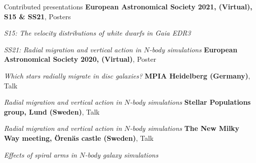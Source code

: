 \begin{rubric}{Contributed presentations}
%
\textbf{European Astronomical Society 2021, (Virtual), S15 \& SS21}, Posters\par
\textit{S15: The velocity distributions of white dwarfs in Gaia EDR3}\par 
\textit{SS21: Radial migration and vertical action in $N$-body simulations}
%
%
\textbf{European Astronomical Society 2020, (Virtual)}, Poster\par
\textit{Which stars radially migrate in disc galaxies?}
%
\entry*[6 May 2020]%
\textbf{MPIA Heidelberg (Germany)}, Talk \par
\textit{Radial migration and vertical action in $N$-body simulations}
%
\entry*[5 May 2020]%
\textbf{Stellar Populations group, Lund (Sweden)}, Talk \par
\textit{Radial migration and vertical action in $N$-body simulations}
%
\entry*[27 May 2019]%
\textbf{The New Milky Way meeting, Örenäs castle (Sweden)}, Talk \par
\textit{Effects of spiral arms in $N$-body galaxy simulations}
%
%
\end{rubric}